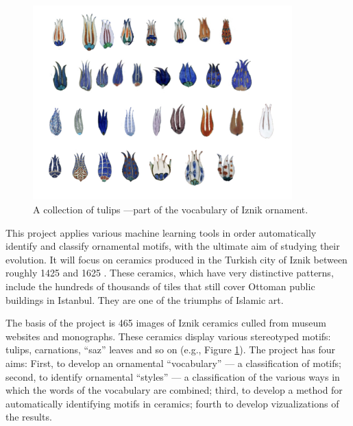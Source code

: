 \documentclass[10pt]{article}
\begin{document}
\begin{figure}
\includegraphics[width=10cm]{tulipcol}
\caption{A collection of tulips ---part of the vocabulary of Iznik ornament.}
\label{fig:tulipcol}
\end{figure}
This project applies various machine learning tools in order automatically identify and classify ornamental motifs, with the ultimate aim of studying their evolution.  It will focus on ceramics produced in the Turkish city of Iznik between roughly 1425 and 1625 \parencite{Atasoy1994}. These ceramics, which have very distinctive patterns, include the hundreds of thousands of tiles that still cover Ottoman public buildings in Istanbul. They are one of the triumphs of Islamic art.

The basis of the project is 465 images of Iznik ceramics culled from museum websites and monographs.  These ceramics display various stereotyped motifs:  tulips, carnations, ``saz'' leaves and so on (e.g., Figure \ref{fig:tulipcol}). The project has four aims: First, to develop an ornamental ``vocabulary'' --- a classification of motifs; second, to identify ornamental ``styles'' --- a classification of the various ways in which the words of the vocabulary are combined; third, to develop a method for automatically identifying motifs in ceramics; fourth to develop vizualizations of the results. 


\end{document}
